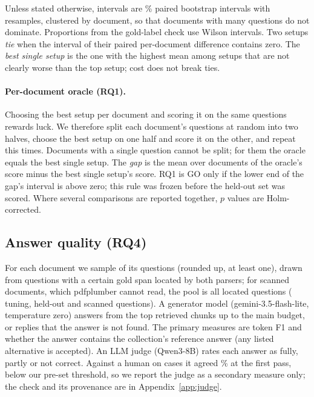 Unless stated otherwise, intervals are \CILevel{}\% paired bootstrap intervals with
\Resamples{} resamples, clustered by document, so that documents with
many questions do not dominate. Proportions from the gold-label check use Wilson intervals.
Two setups \emph{tie} when the interval of their paired per-document
difference contains zero. The \emph{best single setup} is the one with
the highest mean among setups that are not clearly worse than the top setup;
cost does not break ties.

\paragraph{Per-document oracle (RQ1).} Choosing the best setup per
document and scoring it on the same questions rewards luck. We
therefore split each document's questions at random into two halves,
choose the best setup on one half and score it on the other, and repeat
this \SplitHalfReps{} times. Documents with a single question cannot be split; for them the oracle equals the
best single setup.
The \emph{gap} is the mean over documents of the oracle's score minus
the best single setup's score. RQ1 is GO only if the lower end of the
gap's interval is above zero; this rule was frozen before the held-out
set was scored. Where several comparisons are reported together, $p$
values are Holm-corrected.

\subsection{Answer quality (RQ4)}
\label{sec:aq}

For each document we sample \AQSampleShare{} of its questions (rounded up, at least one), drawn from questions
with a certain gold span located by both parsers; for scanned documents, which pdfplumber cannot read, the pool
is all located questions
(\AQTuningQuestions{} tuning, \AQHeldOutQuestions{} held-out and
\AQScannedQuestions{} scanned questions). A generator model
(gemini-3.5-flash-lite, temperature zero) answers from the top
retrieved chunks up to the main budget, or replies that the answer is
not found. The primary measures are token F1 and whether the answer
contains the collection's reference answer (any listed alternative is accepted). An LLM judge (Qwen3-8B) rates each answer as
fully, partly or not correct. Against a human on \JudgeCases{} cases it
agreed \ManualJudgeFirstPassAgreement{}\% at the first pass, below our
pre-set threshold, so we report the judge as a secondary measure only;
the check and its provenance are in Appendix~\ref{app:judge}.

